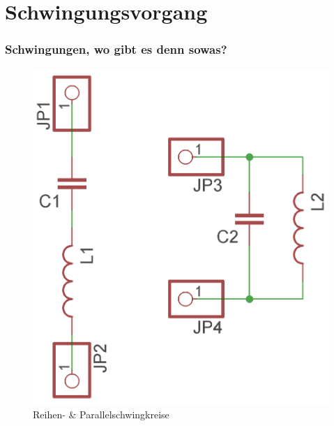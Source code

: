 

\subtitle{Technik Klasse E 07: \\
  Schwingkreise \& Filter \\[2em]}
\date{Stand 18.09.2017}


\section*{Schwingungs\-vorgang}

\begin{frame}
  \frametitle{Schwingungen, wo gibt es denn sowas?}
  \begin{center}
    \begin{figure}
      \includegraphics[width=\textwidth,height=.75\textheight,keepaspectratio]{e07/Schwingkreise.png}
      \caption{Reihen- \& Parallelschwingkreise}
    \end{figure}
  \end{center}
\end{frame}

